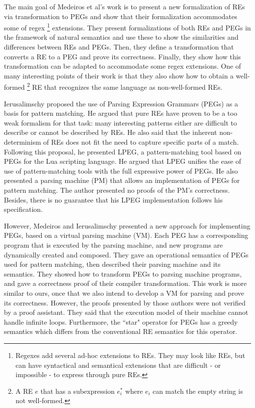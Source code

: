 \documentclass[oneside,12pt]{scrbook}
\theoremstyle{definition}
\theoremstyle{plain}
\theoremstyle{definition}
\begin{document}
The main goal of Medeiros et al's work \cite{Mascarenhas2011} is to present a new formalization of REs via transformation to PEGs and show that their formalization accommodates some of regex \footnote{Regexes add several ad-hoc extensions to REs. They may look like REs, but can have syntactical and semantical extensions that are difficult - or impossible - to express through pure REs.} extensions. They present formalizations of both REs and PEGs in the framework of natural semantics and use these to show the similarities and differences between REs and PEGs. Then, they define a transformation that converts a RE to a PEG and prove its correctness. Finally, they show how this transformation can be adapted to accommodate some regex extensions. One of many interesting points of their work is that they also show how to obtain a well-formed \footnote{A RE $e$ that has a subexpression $e^*_i$ where $e_i$ can match the empty string is not well-formed.} RE that recognizes the same language as non-well-formed REs.
 


Ierusalimschy \cite{Ierusalimschy2009} proposed the use of Parsing Expression Grammars (PEGs) as a basis for pattern matching. He argued that pure REs have proven to be a too weak formalism for that task: many interesting patterns either are difficult to describe or cannot be described by REs. He also said that the inherent non-determinism of REs does not fit the need to capture specific parts of a match. Following this proposal, he presented LPEG, a pattern-matching tool based on PEGs for the Lua scripting language. He argued that LPEG unifies the ease of use of pattern-matching tools with the full expressive power of PEGs. He also presented a parsing machine (PM) that allows an implementation of PEGs for pattern matching. The author presented no proofs of the PM's correctness. Besides, there is no guarantee that his LPEG implementation follows his specification.


However, Medeiros and Ierusalimschy \cite{Medeiros2008} presented a new approach for implementing PEGs, based on a virtual parsing machine (VM). Each PEG has a corresponding program that is executed by the parsing machine, and new programs are dynamically created and composed. They gave an operational semantics of PEGs used for pattern matching, then described their parsing machine and its semantics.
They showed how to transform PEGs to parsing machine programs, and gave a correctness proof of their compiler transformation. This work is more similar to ours, once that we also intend to develop a VM for parsing and prove its correctness. However, the proofs presented by those authors were not verified by a proof assistant. They said that the execution model of their machine cannot handle infinite loops. Furthermore, the ``star" operator for PEGs has a greedy semantics which differs from the conventional RE semantics for this operator.
\end{document}
